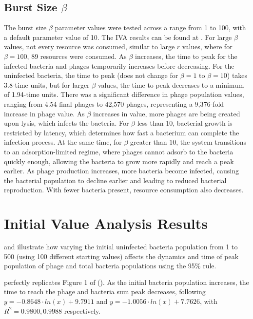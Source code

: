 \subsection{Burst Size $\beta$}
The burst size $\beta$ parameter values were tested across a range from 1 to 100, with a default parameter value of 10. 
The IVA results can be found at . 
For large $\beta$ values, not every resource was consumed, similar to large $r$ values, where for $\beta=100$, 89 resources were consumed. 
As $\beta$ increases, the time to peak for the infected bacteria and phages temporarily increases before decreasing. 
For the uninfected bacteria, the time to peak (does not change for $\beta=1$ to $\beta=10$) takes 3.8-time units, but for larger $\beta$ values, the time to peak decreases to a minimum of 1.94-time units. 
There was a significant difference in phage population values, ranging from 4.54 final phages to 42,570 phages, representing a 9,376-fold increase in phage value. 
As $\beta$ increases in value, more phages are being created upon lysis, which infects the bacteria. 
For $\beta$ less than 10, bacterial growth is restricted by latency, which determines how fast a bacterium can complete the infection process. At the same time, for $\beta$ greater than 10, the system transitions to an adsorption-limited regime, where phages cannot adsorb to the bacteria quickly enough, allowing the bacteria to grow more rapidly and reach a peak earlier. 
As phage production increases, more bacteria become infected, causing the bacterial population to decline earlier and leading to reduced bacterial reproduction. 
With fewer bacteria present, resource consumption also decreases.

\section{Initial Value Analysis Results}
\label{sec:results:initial_value_analysis}
 and  illustrate how varying the initial uninfected bacteria population from 1 to 500 (using 100 different starting values) affects the dynamics and time of peak population of phage and total bacteria populations using the 95\% rule. 

 perfectly replicates Figure 1 of \citet{mullaExtremeDiversityPhage2024} (). 
As the initial bacteria population increases, the time to reach the phage and bacteria sum peak decreases, following $y = -0.8648\cdot ln(x) + 9.7911$ and $y = -1.0056\cdot ln(x)+7.7626$, with $R^2=0.9800, 0.9988$ respectively. 

